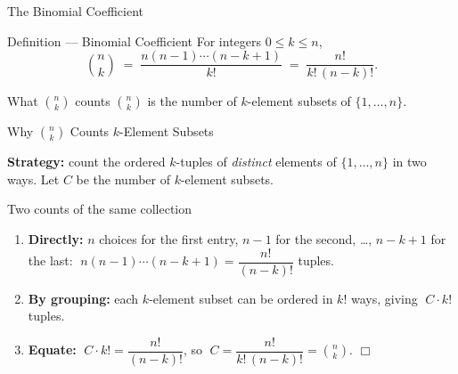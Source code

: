 \documentclass[aspectratio=169,12pt,t]{beamer}
\begin{document}
{%
\begin{frame}{The Binomial Coefficient}
  \begin{defblock}{Definition --- Binomial Coefficient}
    For integers $0 \leq k \leq n$,
    \[
      \binom{n}{k} \;=\; \frac{n (n - 1) \cdots (n - k + 1)}{k!} \;=\; \frac{n!}{k!\,(n-k)!}.
    \]
  \end{defblock}

  \vspace{0.5em}
  \begin{thmblock}{What $\binom{n}{k}$ counts}
    $\binom{n}{k}$ is the number of $k$-element subsets of $\{1, \dots, n\}$.
  \end{thmblock}

\end{frame}

\begin{frame}{Why $\binom{n}{k}$ Counts $k$-Element Subsets}
  \begin{hlbox}
    \textbf{Strategy:} count the ordered $k$-tuples of \emph{distinct} elements of $\{1,\dots,n\}$ in two ways. Let $C$ be the number of $k$-element subsets.
  \end{hlbox}

  \vspace{0.4em}
  \begin{proofblock}{Two counts of the same collection}
    \begin{enumerate}
      \item \textbf{Directly:} $n$ choices for the first entry, $n-1$ for the second, \ldots, $n-k+1$ for the last:
        $\;n(n-1)\cdots(n-k+1) = \dfrac{n!}{(n-k)!}$ tuples.
      \item \textbf{By grouping:} each $k$-element subset can be ordered in $k!$ ways, giving $\;C \cdot k!$ tuples.
      \item \textbf{Equate:} $\;C \cdot k! = \dfrac{n!}{(n-k)!}$, \;so $\;C = \dfrac{n!}{k!\,(n-k)!} = \binom{n}{k}$. \quad $\Box$
    \end{enumerate}
  \end{proofblock}


\end{frame}}
\end{document}
